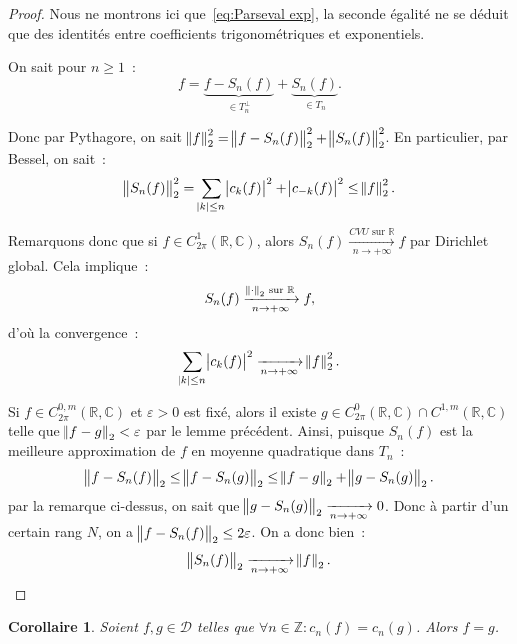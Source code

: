 \documentclass{report}
\newtheorem{cor}[thm]{Corollaire}
\theoremstyle{definition}
\theoremstyle{remark}
\numberwithin{equation}{section}
\newcommand{\C}{\mathbb C}
\newcommand{\R}{\mathbb R}
\newcommand{\Z}{\mathbb Z}
\newcommand{\CONV}[5]{\xrightarrow[#2 \to #3]{#4 \text{ #5 } #1}}
\newcommand{\CVU}[3]{\CONV{#1}{#2}{#3}{CVU}{sur}}
\newcommand{\pinfty}{{+\infty}}
\newcommand{\CmT}[2]{C^{#1,m}_{#2}}
\newcommand{\CzmT}[1]{\CmT 0{#1}}
\newcommand{\Czm}{\CzmT{2\pi}}
\begin{document}
			\begin{proof} Nous ne montrons ici que~\eqref{eq:Parseval exp}, la seconde égalité ne se déduit que des identités entre coefficients trigonométriques
			et exponentiels.

			On sait pour $n \geq 1$~:
			\begin{equation}
				f = \underbrace {f-S_n(f)}_{\in T_n^\perp} + \underbrace {S_n(f)}_{\in T_n}.
			\end{equation}

			Donc par Pythagore, on sait $\norm f_2^2 = \norm {f-S_n(f)}_2^2 + \norm {S_n(f)}_2^2$. En particulier, par Bessel, on sait~:
			\begin{equation}
				\norm {S_n(f)}_2^2 = \sum_{\abs k \leq n}\abs {c_k(f)}^2 + \abs {c_{-k}(f)}^2 \leq \norm f_2^2.
			\end{equation}

			Remarquons donc que si $f \in C^1_{2\pi}(\R, \C)$, alors $S_n(f) \CVU \R n\pinfty f$ par Dirichlet global. Cela implique~:
			\begin{equation}
				S_n(f) \xrightarrow[n \to \pinfty]{\norm \cdot_2 \text{ sur } \R} f,
			\end{equation}
			d'où la convergence~:
			\begin{equation}
				\sum_{\abs k \leq n}\abs {c_k(f)}^2 \xrightarrow[n \to \pinfty]{} \norm f_2^2.
			\end{equation}

			Si $f \in \Czm(\R, \C)$ et $\varepsilon > 0$ est fixé, alors il existe $g \in C^0_{2\pi}(\R, \C) \cap C^{1,m}(\R, \C)$ telle que $\norm {f-g}_2 < \varepsilon$
			par le lemme précédent. Ainsi, puisque $S_n(f)$ est la meilleure approximation de $f$ en moyenne quadratique dans $T_n$~:
			\begin{equation}
				\norm {f-S_n(f)}_2 \leq \norm {f-S_n(g)}_2 \leq \norm {f-g}_2 + \norm {g-S_n(g)}_2.
			\end{equation}
			par la remarque ci-dessus, on sait que $\norm {g-S_n(g)}_2 \xrightarrow[n \to \pinfty]{} 0$. Donc à partir d'un certain rang $N$, on a
			$\norm {f-S_n(f)}_2 \leq 2\varepsilon$. On a donc bien~:
			\begin{equation}
				\norm {S_n(f)}_2 \xrightarrow[n \to \pinfty]{} \norm f_2.
			\end{equation}
			\end{proof}

			\begin{cor} Soient $f, g \in \mathcal D$ telles que $\forall n \in \Z : c_n(f) = c_n(g)$. Alors $f=g$.
			\end{cor}
\end{document}
